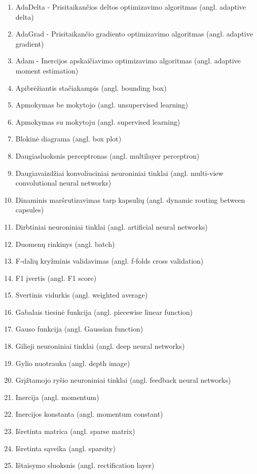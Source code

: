 
\begin{enumerate}
	\item AdaDelta - Prisitaikančios deltos optimizavimo algoritmas (angl. adaptive delta)
	\item AdaGrad - Prisitaikančio gradiento optimizavimo algoritmas (angl. adaptive gradient)
	\item Adam - Inercijos apskaičiavimo optimizavimo algoritmas (angl. adaptive moment estimation)
	\item Apibrėžiantis stačiakampis (angl. bounding box)
	\item Apmokymas be mokytojo (angl. unsupervised learning)
	\item Apmokymas su mokytoju (angl. supervised learning)
	\item Blokinė diagrama (angl. box plot)
	\item Daugiasluoksnis perceptronas (angl. multilayer perceptron)
	\item Daugiavaizdžiai konvoliuciniai neuroniniai tinklai (angl. multi-view convolutional neural networks)
	\item Dinaminis maršrutizavimas tarp kapsulių (angl. dynamic routing between capsules)
	\item Dirbtiniai neuroniniai tinklai (angl. artificial neural networks)
	\item Duomenų rinkinys (angl. batch)
	\item F-dalių kryžminis validavimas (angl. f-folds cross validation)
	\item F1 įvertis (angl. F1 score)
	\item Svertinis vidurkis (angl. weighted average)
	\item Gabalais tiesinė funkcija (angl. piecewise linear function)
	\item Gauso funkcija (angl. Gaussian function)
	\item Gilieji neuroniniai tinklai (angl. deep neural networks)
	\item Gylio nuotrauka (angl. depth image)
	\item Grįžtamojo ryšio neuroniniai tinklai (angl. feedback neural networks)
	\item Inercija (angl. momentum)
	\item Inercijos konstanta (angl. momentum constant)
	\item Išretinta matrica (angl. sparse matrix)
	\item Išretinta sąveika (angl. sparsity)
	\item Ištaisymo sluoksnis (angl. rectification layer)

\end{enumerate}
